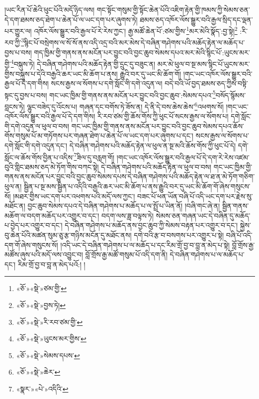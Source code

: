 །ཡང་རིན་པོ་ཆེའི་ཕུང་པོའི་མདོ་ཉིད་ལས། གང་སྟོང་གསུམ་གྱི་སྟོང་ཆེན་པོའི་འཇིག་རྟེན་གྱི་ཁམས་ཀྱི་སེམས་ཅན་དེ་དག་ཐམས་ཅད་ཐེག་པ་ཆེན་པོ་ལ་ཡང་དག་པར་ཞུགས་ཏེ། ཐམས་ཅད་འཁོར་ལོས་སྒྱུར་བའི་རྒྱལ་སྲིད་དང་ལྡན་པར་གྱུར་ལ། འཁོར་ལོས་སྒྱུར་བའི་རྒྱལ་པོ་རེ་རེས་ཀྱང་། རྒྱ་མཚོ་ཆེན་པོ་:ཙམ་གྱིས་\footnote{«ཅོ་»«སྡེ་»ཙམ་གྱི་}མར་མེའི་སྣོད་:བྱ་སྟེ།\footnote{«ཅོ་»«སྡེ་»བྱས་ཏེ།} :རི་རབ་ཀྱི་\footnote{«ཅོ་»«སྡེ་»རི་རབ་ཙམ་གྱི་}སྙིང་པོ་བསྲེགས་ལ་སོ་སོ་ནས་འདི་འདྲ་བའི་མར་མེས་དེ་བཞིན་གཤེགས་པའི་མཆོད་རྟེན་ལ་མཆོད་པ་བྱས་པ་བས། གད་ཁྱིམ་གྱི་གནས་ནས་མངོན་པར་བྱུང་བའི་བྱང་ཆུབ་སེམས་དཔའ་མར་མེའི་སྙིང་པོ་:ཡུངས་མར་གྱི་\footnote{«ཅོ་»«སྡེ་»ཡུངས་མར་གྱིས་}བསྐུས་ཏེ། དེ་བཞིན་གཤེགས་པའི་མཆོད་རྟེན་གྱི་དྲུང་དུ་བཟུང་ན། མར་མེ་ཕུལ་བ་སྔ་མས་སྙིང་པོ་ཡུངས་མར་གྱིས་བསྐུས་པ་དེའི་བརྒྱའི་ཆར་ཡང་མི་ཆོག་པ་ནས། རྒྱུའི་བར་དུ་ཡང་མི་ཆོག་གོ། །གང་ཡང་འཁོར་ལོས་སྒྱུར་བའི་རྒྱལ་པོ་དེ་དག་གིས། སངས་རྒྱས་ལ་སོགས་པ་དགེ་སློང་གི་དགེ་འདུན་ལ། བདེ་བའི་ཡོ་བྱད་ཐམས་ཅད་ཀྱིས་བསྟི་སྟང་དུ་བྱས་པ་བས། གང་ཡང་ཁྱིམ་གྱི་གནས་ནས་མངོན་པར་བྱུང་བའི་བྱང་ཆུབ་:སེམས་དཔའ་\footnote{«ཅོ་»«སྡེ་»སེམས་དཔས་}བསོད་སྙོམས་བླངས་ཏེ། ལྷུང་བཟེད་དུ་འོངས་པ། གཞན་དང་བགོས་ཏེ་ཟོས་ན། དེ་ནི་དེ་བས་ཆེས་ཆེས་\footnote{«ཅོ་»«སྡེ་»ཆེར་}འཕགས་སོ། །གང་ཡང་འཁོར་ལོས་སྒྱུར་བའི་རྒྱལ་པོ་དེ་དག་གིས། རི་རབ་ཙམ་གྱི་ཆོས་གོས་ཀྱི་ཕུང་པོ་སངས་རྒྱས་ལ་སོགས་པ། དགེ་སློང་གི་དགེ་འདུན་ལ་ཕུལ་བ་བས། གང་ཡང་ཁྱིམ་གྱི་གནས་ནས་མངོན་པར་བྱུང་བའི་བྱང་ཆུབ་སེམས་དཔའ་ཆོས་གོས་གསུམ་པོ་མ་གཏོགས་པར་གཞན་ཐེག་པ་ཆེན་པོ་ལ་ཡང་དག་པར་ཞུགས་པ་དང་། སངས་རྒྱས་ལ་སོགས་པ་དགེ་སློང་གི་དགེ་འདུན་དང་། དེ་བཞིན་གཤེགས་པའི་མཆོད་རྟེན་ལ་ཕུལ་ན་སྔ་མའི་ཆོས་གོས་ཀྱི་ཕུང་པོ་དེ། དགེ་སློང་ལ་ཆོས་གོས་བྱིན་པ་འདིས་\footnote{«སྣར་»«པེ་»འདིའི་}ཟིལ་དུ་བརླག་གོ། །གང་ཡང་འཁོར་ལོས་སྒྱུར་བའི་རྒྱལ་པོ་དེ་དག་རེ་རེས་འཛམ་བུའི་གླིང་ཐམས་ཅད་མེ་ཏོག་གིས་བཀང་སྟེ། དེ་བཞིན་གཤེགས་པའི་མཆོད་རྟེན་ལ་ཕུལ་བ་བས། གང་ཡང་ཁྱིམ་གྱི་གནས་ནས་མངོན་པར་བྱུང་བའི་བྱང་ཆུབ་སེམས་དཔས་དེ་བཞིན་གཤེགས་པའི་མཆོད་རྟེན་ལ་ཐ་ན་མེ་ཏོག་གཅིག་ཕུལ་ན། སྦྱིན་པ་སྔ་མས་སྦྱིན་པ་འདིའི་བརྒྱའི་ཆར་ཡང་མི་ཆོག་པ་ནས་རྒྱུའི་བར་དུ་ཡང་མི་ཆོག་གོ་ཞེས་གསུངས་སོ། །མཐར་གྱིས་ཡང་དག་པར་འཕགས་པའི་མདོ་ལས་ཀྱང་། བཟང་པོ་ཕན་ཡོན་བཞི་པོ་འདི་ཡང་དག་པར་རྗེས་སུ་མཐོང་ན། བྱང་ཆུབ་སེམས་དཔའ་དེ་བཞིན་གཤེགས་པ་མཆོད་པ་ལ་སྤྲོ་པ་ཡིན་ནོ། །བཞི་གང་ཞེ་ན། སྦྱིན་གནས་མཆོག་ལ་བདག་མཆོད་པར་འགྱུར་བ་དང་། བདག་ལས་ཟླ་བལྟས་ཏེ། སེམས་ཅན་གཞན་ཡང་དེ་བཞིན་དུ་མཆོད་པ་བྱེད་པར་འགྱུར་བ་དང་། དེ་བཞིན་གཤེགས་པ་མཆོད་ནས་བྱང་ཆུབ་ཀྱི་སེམས་བརྟན་པར་འགྱུར་བ་དང་། སྐྱེས་བུ་ཆེན་པོའི་མཚན་སུམ་ཅུ་རྩ་གཉིས་མངོན་དུ་མཐོང་ནས། དགེ་བའི་རྩ་བ་བསགས་པར་འགྱུར་པ་སྟེ། བཞི་པོ་འདི་དག་གོ་ཞེས་གསུངས་སོ། །འདི་ཡང་དེ་བཞིན་གཤེགས་པ་ལ་མཆོད་པ་དང་རིམ་གྲོ་བྱ་བ་བླ་ན་མེད་པ་སྟེ། བློ་གྲོས་རྒྱ་མཚོས་ཞུས་པའི་མདོ་ལས་འབྱུང་བ། བློ་གྲོས་རྒྱ་མཚོ་གསུམ་པོ་འདི་དག་ནི། དེ་བཞིན་གཤེགས་པ་ལ་མཆོད་པ་དང་། རིམ་གྲོ་བྱ་བ་བླ་ན་མེད་པའོ:། །
